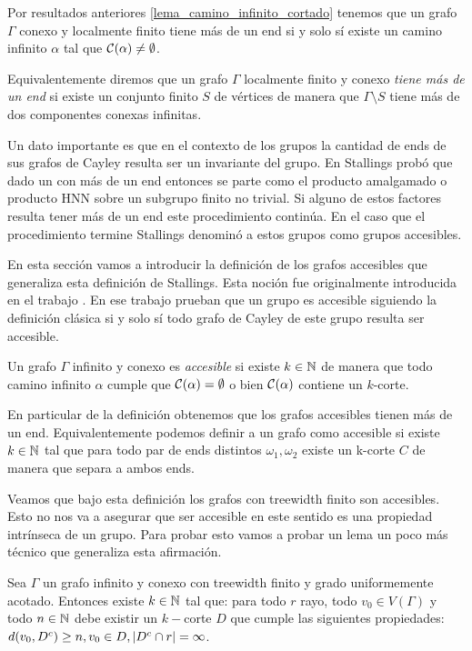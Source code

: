 \documentclass[tesis.tex]{subfiles}
\begin{document}
Por resultados anteriores \ref{lema_camino_infinito_cortado} tenemos que un grafo $\Gamma$ conexo y localmente finito tiene más de un end si y solo sí existe un camino infinito $\alpha$ tal que ${\cal C}(\alpha) \neq \emptyset$.

Equivalentemente diremos que un grafo $\Gamma$ localmente finito y conexo \emph{tiene más de un end} si existe un conjunto finito $S$ de vértices de manera que $\Gamma \setminus S$ tiene más de dos componentes conexas infinitas.

Un dato importante es que en el contexto de los grupos la cantidad de ends de sus grafos de Cayley resulta ser un invariante del grupo.
En \cite{stallings1971group} Stallings probó que dado un \fg con más de un end entonces se parte como el producto amalgamado o producto HNN sobre un subgrupo finito no trivial.
Si alguno de estos factores resulta tener más de un end este procedimiento continúa.
En el caso que el procedimiento termine Stallings denominó a estos grupos como grupos accesibles. 

En esta sección vamos a introducir la definición de los grafos accesibles que generaliza esta definición de Stallings.
Esta noción fue originalmente introducida en el trabajo \cite{thomassen1993vertex}.
En ese trabajo prueban que un grupo es accesible siguiendo la definición clásica si y solo sí todo grafo de Cayley de este grupo resulta ser accesible.
\begin{deff}
	Un grafo $\Gamma$ infinito y conexo es \emph{accesible} si existe $k \in \mathbb{N}$ de manera que todo camino infinito $\alpha$ cumple que ${\cal C}(\alpha) = \emptyset$ o bien ${\cal C}(\alpha)$ contiene un $k$-corte.
\end{deff}
En particular de la definición obtenemos que los grafos accesibles tienen más de un end.
Equivalentemente podemos definir a un grafo como accesible si existe $k \in \mathbb{N}$ tal que para todo par de ends distintos $\omega_1, \omega_2$ existe un k-corte $C$ de manera que separa a ambos ends.


Veamos que bajo esta definición los grafos con treewidth finito son accesibles.
Esto no nos va a asegurar que ser accesible en este sentido es una propiedad intrínseca de un grupo.
Para probar esto vamos a probar un lema un poco más técnico que generaliza esta afirmación.

\begin{lema}\label{lema_corte_treewidth}
	Sea $\Gamma$ un grafo infinito y conexo con treewidth finito y grado uniformemente acotado.
	Entonces existe $k \in \mathbb{N}$ tal que:
	para todo $r$ rayo, todo $v_0 \in V(\Gamma)$ y todo $n \in \mathbb{N}$ debe existir un $k-$corte $D$ que cumple las siguientes propiedades: $d(v_0,D^{c}) \ge n, v_0 \in D, |D^{c} \cap r| = \infty$. 
\end{lema}
\end{document}
